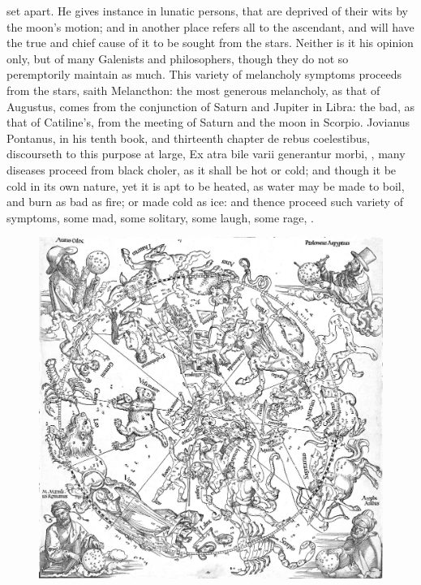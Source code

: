 {set apart. He gives instance in lunatic persons, that are deprived of
their wits by the moon's motion; and in another place refers all to the
ascendant, and will have the true and chief cause of it to be sought
from the stars. Neither is it his opinion only, but of many Galenists
and philosophers, though they do not so peremptorily maintain as much.
This variety of melancholy symptoms proceeds from the stars, saith
Melancthon: the most generous melancholy, as that of Augustus,
comes from the conjunction of Saturn and Jupiter in Libra: the bad, as
that of Catiline's, from the meeting of Saturn and the moon in Scorpio.
Jovianus Pontanus, in his tenth book, and thirteenth chapter de rebus
coelestibus, discourseth to this purpose at large, Ex atra bile varii
generantur morbi, \etc{}, many diseases proceed from black choler,
as it shall be hot or cold; and though it be cold in its own nature,
yet it is apt to be heated, as water may be made to boil, and burn as
bad as fire; or made cold as ice: and thence proceed such variety of
symptoms, some mad, some solitary, some laugh, some rage, \etc{}.

\begin{figure}[p]
  \centering
  \includegraphics[keepaspectratio,width=\textwidth]{figures/SkyMap-small.jpg}
  \caption{}
  \label{fig:skymap}
\end{figure}

}
